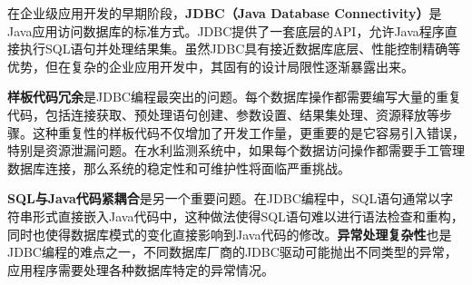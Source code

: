 在企业级应用开发的早期阶段，\textbf{JDBC（Java Database Connectivity）}是Java应用访问数据库的标准方式。JDBC提供了一套底层的API，允许Java程序直接执行SQL语句并处理结果集。虽然JDBC具有接近数据库底层、性能控制精确等优势，但在复杂的企业应用开发中，其固有的设计局限性逐渐暴露出来。

\textbf{样板代码冗余}是JDBC编程最突出的问题。每个数据库操作都需要编写大量的重复代码，包括连接获取、预处理语句创建、参数设置、结果集处理、资源释放等步骤。这种重复性的样板代码不仅增加了开发工作量，更重要的是它容易引入错误，特别是资源泄漏问题。在水利监测系统中，如果每个数据访问操作都需要手工管理数据库连接，那么系统的稳定性和可维护性将面临严重挑战。

\textbf{SQL与Java代码紧耦合}是另一个重要问题。在JDBC编程中，SQL语句通常以字符串形式直接嵌入Java代码中，这种做法使得SQL语句难以进行语法检查和重构，同时也使得数据库模式的变化直接影响到Java代码的修改。\textbf{异常处理复杂性}也是JDBC编程的难点之一，不同数据库厂商的JDBC驱动可能抛出不同类型的异常，应用程序需要处理各种数据库特定的异常情况。

